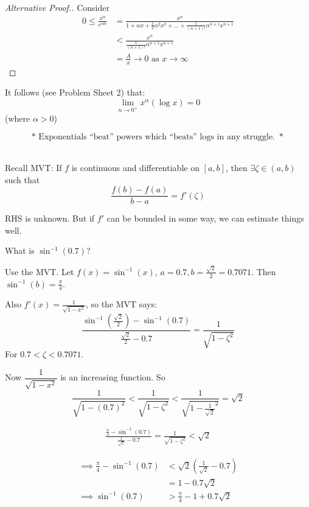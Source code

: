 \documentclass[twoside]{scrartcl}
\begin{document}
\begin{proof}[Alternative Proof.]
Consider 
\[
\begin{aligned}
  0 \leq \frac{x^n}{e^{\alpha n}} &= \frac{x^n}{1 + \alpha x + \frac{1}{2}\alpha^2x^2 + \dots + \frac{1}{(n+1)!}\alpha^{n+1}x^{n+1}}\\
  &< \frac{x^n}{\frac{1}{(n+1)!}\alpha^{n+1}x^{n+1}}\\
  &= \frac{A}{x} \to 0 \text{ as } x \to \infty 
\end{aligned}
\]
\end{proof}

It follows (see Problem Sheet 2) that: 
\[\lim_{n \to 0^+} x^{\alpha}(\log x) = 0\]
(where $\alpha > 0$)

\[\boxed{* \text{ Exponentials ``beat'' powers which ``beats'' logs in any struggle. } *}\]~\\



Recall MVT: If $f$ is continuous and differentiable on $[a,b]$, then $\exists \zeta \in (a,b)$ such that
\[\frac{f(b)-f(a)}{b-a} = f'(\zeta)\]

RHS is unknown. But if $f'$ can be bounded in some way, we can estimate things well.\\

\begin{example}
What is $\sin^{-1}(0.7)$? 

Use the MVT. Let $f(x) = \sin^{-1}(x)$, $a = 0.7, b = \frac{\sqrt{2}}{2} = 0.7071$. Then $\sin^{-1}(b) = \frac{\pi}{4}$. 

Also $f'(x) = \frac{1}{\sqrt{1-x^2}}$, so the MVT says: 
\[\frac{\sin^{-1}(\frac{\sqrt{2}}{2}) - \sin^{-1}(0.7)}{\frac{\sqrt{2}}{2} - 0.7} = \frac{1}{\sqrt{1-\zeta^2}}\]
For $0.7<\zeta < 0.7071$.  

Now $\dfrac{1}{\sqrt{1-x^2}}$ is an increasing function. So 
\[\frac{1}{\sqrt{1-(0.7)^2}} 
< \frac{1}{\sqrt{1-\zeta^2}} 
< \frac{1}{\sqrt{1-\frac{1}{\sqrt{2}}^2 }} = \sqrt{2}\]

\[
\begin{aligned}
  \frac{\frac{\pi}{4} - \sin^{-1}(0.7)}{\frac{1}{\sqrt{2}}-0.7} = \frac{1}{\sqrt{1-\zeta^2}} < \sqrt{2} 
\end{aligned}
\]

\[\begin{aligned}\implies \frac{\pi}{4}-\sin^{-1}(0.7) &< \sqrt{2}(\textstyle{\frac{1}{\sqrt{2}}} - 0.7)\\
&= 1 - 0.7\sqrt{2}\\[0.2cm]
\implies \sin^{-1}(0.7) &> \frac{\pi}{4} -1 + 0.7\sqrt{2}\end{aligned}\]
\end{example}\vspace*{5pt}
\end{document}
